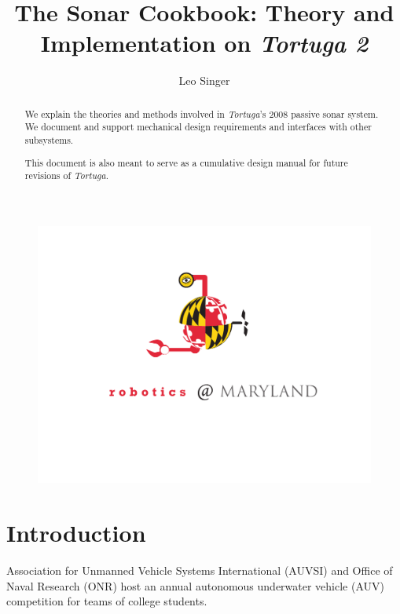 \documentclass[10pt]{article}
\title{The Sonar Cookbook: Theory and Implementation on \textit{Tortuga 2}}
\author{Leo Singer}
\begin{document}
\maketitle

\begin{abstract}
We explain the theories and methods involved in \textit{Tortuga}'s 2008 passive sonar system.  We document and support mechanical design requirements and interfaces with other subsystems.

This document is also meant to serve as a cumulative design manual for future revisions of \textit{Tortuga}.
\end{abstract}

\begin{figure}[htbp]
\begin{center}
\includegraphics[scale=0.4]{robocrab.pdf}
\label{fig:robocrab}
\end{center}
\end{figure}

\clearpage

\tableofcontents

\clearpage

\section{Introduction}

Association for Unmanned Vehicle Systems International (AUVSI) and Office of Naval Research (ONR) host an annual autonomous underwater vehicle (AUV) competition for teams of college students.
\end{document}
